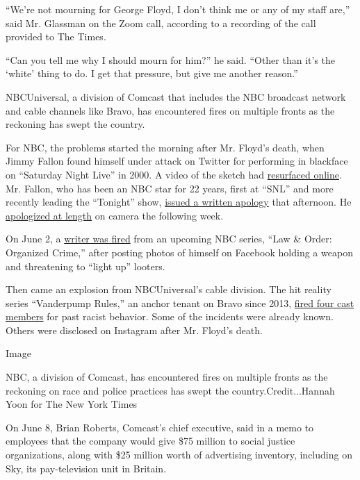 ``We're not mourning for George Floyd, I don't think me or any of my
staff are,'' said Mr. Glassman on the Zoom call, according to a
recording of the call provided to The Times.

``Can you tell me why I should mourn for him?'' he said. ``Other than
it's the `white' thing to do. I get that pressure, but give me another
reason.''

NBCUniversal, a division of Comcast that includes the NBC broadcast
network and cable channels like Bravo, has encountered fires on multiple
fronts as the reckoning has swept the country.

For NBC, the problems started the morning after Mr. Floyd's death, when
Jimmy Fallon found himself under attack on Twitter for performing in
blackface on ``Saturday Night Live'' in 2000. A video of the sketch had
\href{https://www.youtube.com/watch?v=XPau1pLm3jQ}{resurfaced online}.
Mr. Fallon, who has been an NBC star for 22 years, first at ``SNL'' and
more recently leading the ``Tonight'' show,
\href{https://www.nytimes3xbfgragh.onion/2020/05/26/us/jimmy-fallon-chris-rock-blackface.html}{issued
a written apology} that afternoon. He
\href{https://deadline.com/2020/06/jimmy-fallon-emotional-apology-snl-blackface-skit-tonight-show-return-naacp-derrick-johnson-cnn-don-lemon-saturday-night-live-video-1202949008/}{apologized
at length} on camera the following week.

On June 2, a
\href{https://variety.com/2020/tv/news/dick-wolf-craig-gore-fired-law-and-order-spinoff-controversial-facebook-posts-1234623190/}{writer
was fired} from an upcoming NBC series, ``Law \& Order: Organized
Crime,'' after posting photos of himself on Facebook holding a weapon
and threatening to ``light up'' looters.

Then came an explosion from NBCUniversal's cable division. The hit
reality series ``Vanderpump Rules,'' an anchor tenant on Bravo since
2013,
\href{https://www.today.com/popculture/andy-cohen-absolutely-supports-decision-fire-vanderpump-rules-stars-t183908}{fired
four cast members} for past racist behavior. Some of the incidents were
already known. Others were disclosed on Instagram after Mr. Floyd's
death.

Image

NBC, a division of Comcast, has encountered fires on multiple fronts as
the reckoning on race and police practices has swept the
country.Credit...Hannah Yoon for The New York Times

On June 8, Brian Roberts, Comcast's chief executive, said in a memo to
employees that the company would give \$75 million to social justice
organizations, along with \$25 million worth of advertising inventory,
including on Sky, its pay-television unit in Britain.

